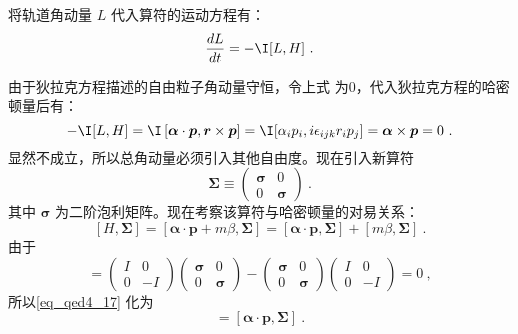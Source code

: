 将轨道角动量 $L$ 代入算符的运动方程有：
\begin{equation}\label{eq_qed4_16}
\frac{d {L}}{d t}=- \I[L,H]~.
\end{equation}

由于狄拉克方程描述的自由粒子角动量守恒，令上式 为0，代入狄拉克方程的哈密顿量后有：
\begin{equation}\label{eq_qed4_18}
- \I[L,H]=
 \I\left[\boldsymbol{\alpha} \cdot \boldsymbol{p},\boldsymbol{r} \times \boldsymbol{p}\right]
= \I[\alpha_ip_i,i\epsilon_{ijk}r_ip_j]=\boldsymbol{\alpha} \times \boldsymbol{p}=0~.
\end{equation}
显然不成立，所以总角动量必须引入其他自由度。现在引入新算符
\begin{equation}
\boldsymbol{\Sigma} \equiv\left(\begin{array}{cc}
\boldsymbol{\sigma} & 0 \\
0 & \boldsymbol{\sigma}
\end{array}\right)~.
\end{equation}
其中 $\boldsymbol{\sigma}$ 为二阶泡利矩阵。现在考察该算符与哈密顿量的对易关系：
\begin{equation}\label{eq_qed4_17}
[H, \mathbf{\Sigma}]=[\boldsymbol{\alpha} \cdot \boldsymbol{p}+m\beta , \boldsymbol{\Sigma}]=[\boldsymbol{\alpha} \cdot \boldsymbol{p}, \boldsymbol{\Sigma}]+[m\beta , \boldsymbol{\Sigma}]~.
\end{equation}
由于\begin{equation}
[\beta m, \mathbf{\Sigma}]=\left(\begin{array}{cc}
I & 0 \\
0 & -I
\end{array}\right)\left(\begin{array}{cc}
\boldsymbol{\sigma} & 0 \\
0 & \boldsymbol{\sigma}
\end{array}\right)-\left(\begin{array}{cc}
\boldsymbol{\sigma} & 0 \\
0 & \boldsymbol{\sigma}
\end{array}\right)\left(\begin{array}{cc}
I & 0 \\
0 & -I
\end{array}\right)=0~,
\end{equation}
所以\autoref{eq_qed4_17} 化为
\begin{equation}
[H, \Sigma]=[\boldsymbol{\alpha} \cdot \boldsymbol{p}, \boldsymbol{\Sigma}]~.
\end{equation}
